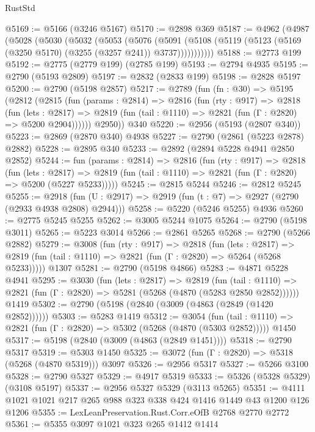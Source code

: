\begin{lexlean}{RustStd}
\begin{coremodule}
@5169 := @5166 (@3246 @5167)
@5170 := @2898 @369
@5187 := @4962
    (@4987
      (@5028
        (@5030
          (@5032
            (@5053
              (@5076
                (@5091
                  (@5108 (@5119 (@5123 (@5169 (@3250 @5170) (@3255 (@3257 @241)) @3737)))))))))))
@5188 := @2773 @199
@5192 := @2775 (@2779 @199) (@2785 @199)
@5193 := @2794 @4935
@5195 := @2790 (@5193 @2809)
@5197 := @2832 (@2833 @199)
@5198 := @2828 @5197
@5200 := @2790 (@5198 @2857)
@5217 := @2789
    (fun (fn : @30) =>
    @5195
      (@2812
        (@2815
          (fun (params : @2814) =>
          @2816
            (fun (rty : @917) =>
            @2818
              (fun (lets : @2817) =>
              @2819 (fun (tail : @1110) => @2821 (fun (Γ : @2820) => @5200 @2904))))))
        @2950))
    @340
@5220 := @2956 (@5193 (@2807 @340))
@5223 := @2869 (@2870 @340) @4938
@5227 := @2790 (@2861 (@5223 @2878) @2882)
@5228 := @2895 @340
@5233 := @2892 (@2894 @5228 @4941 @2850 @2852)
@5244 := fun (params : @2814) =>
  @2816
    (fun (rty : @917) =>
    @2818
      (fun (lets : @2817) =>
      @2819 (fun (tail : @1110) => @2821 (fun (Γ : @2820) => @5200 (@5227 @5233)))))
@5245 := @2815 @5244
@5246 := @2812 @5245
@5255 := @2918 (fun (U : @2917) => @2919 (fun (t : @7) => @2927 (@2790 (@2933 @4938 @2808) @2944)))
@5258 := @5220 (@5246 @5255) @4936
@5260 := @2775 @5245 @5255
@5262 := @3005 @5244 @1075
@5264 := @2790 (@5198 @3011)
@5265 := @5223 @3014
@5266 := @2861 @5265
@5268 := @2790 (@5266 @2882)
@5279 := @3008
    (fun (rty : @917) =>
    @2818
      (fun (lets : @2817) =>
      @2819 (fun (tail : @1110) => @2821 (fun (Γ : @2820) => @5264 (@5268 @5233)))))
    @1307
@5281 := @2790 (@5198 @4866)
@5283 := @4871 @5228 @4941
@5295 := @3030
    (fun (lets : @2817) =>
    @2819
      (fun (tail : @1110) => @2821 (fun (Γ : @2820) => @5281 (@5268 (@4870 (@5283 @2850 @2852))))))
    @1419
@5302 := @2790 (@5198 (@2840 (@3009 (@4863 (@2849 (@1420 @2852))))))
@5303 := @5283 @1419
@5312 := @3054
    (fun (tail : @1110) => @2821 (fun (Γ : @2820) => @5302 (@5268 (@4870 (@5303 @2852)))))
    @1450
@5317 := @5198 (@2840 (@3009 (@4863 (@2849 @1451))))
@5318 := @2790 @5317
@5319 := @5303 @1450
@5325 := @3072 (fun (Γ : @2820) => @5318 (@5268 (@4870 @5319))) @3097
@5326 := @2956 @5317
@5327 := @5266 @3100
@5328 := @2790 @5327
@5329 := @4917 @5319
@5333 := @5326 (@5328 @5329) (@3108 @5197)
@5337 := @2956 @5327 @5329 (@3113 @5265)
@5351 := @4111 @1021 @1021 @217 @265 @988 @323 @338 @424 @1416 @1449 @43 @1200 @126 @1206
@5355 := LexLeanPreservation.Rust.Corr.eOfB @2768 @2770 @2772
@5361 := @5355 @3097 @1021 @323 @265 @1412 @1414

\end{coremodule}
\end{lexlean}
